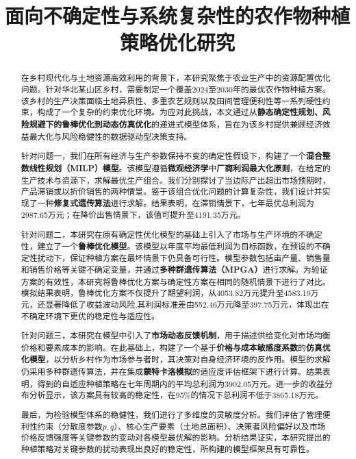 \documentclass[withoutpreface,bwprint]{cumcmthesis} %
\title{面向不确定性与系统复杂性的农作物种植策略优化研究}
\begin{document}
\maketitle
\begin{abstract}
在乡村现代化与土地资源高效利用的背景下，本研究聚焦于农业生产中的资源配置优化问题。针对华北某山区乡村，需要制定一个覆盖2024至2030年的最优农作物种植方案。该乡村的生产决策面临土地异质性、多重农艺规则以及田间管理便利性等一系列硬性约束，构成了一个复杂的约束优化环境。为应对此挑战，本文通过从\textbf{静态确定性规划、风险规避下的鲁棒优化到动态仿真优化}的递进式模型体系，旨在为该乡村提供兼顾经济效益最大化与风险稳健性的数据驱动型决策支持。

针对问题一，我们在所有经济与生产参数保持不变的确定性假设下，构建了一个\textbf{混合整数线性规划（MILP）模型}。该模型遵循\textbf{微观经济学}中\textbf{厂商利润最大化原则}，在给定的生产技术与资源下，求解最优生产组合。我们分别探讨了当边际产出超出市场预期时，产品滞销或以折价销售的两种情景。鉴于该组合优化问题的计算复杂性，我们设计并实现了一种\textbf{修复式遗传算法}进行求解。结果表明，在滞销情景下，七年最优总利润为2987.65万元；在降价出售情景下，该值可提升至4191.35万元。

针对问题二，本研究在原有确定性优化模型的基础上引入了市场与生产环境的不确定性，建立了一个\textbf{鲁棒优化模型}。该模型以年度平均最低利润为目标函数，在预设的不确定性扰动下，保证种植方案在最坏情景下仍具备可行性。模型参数包括亩产量、销售量和销售价格等关键不确定变量，并通过\textbf{多种群遗传算法（MPGA）}进行求解。为验证方案的有效性，本研究将鲁棒优化方案与确定性方案在相同的随机情景下进行了对比。模拟结果表明，鲁棒优化方案不仅提升了期望利润，从4053.82万元提升至4583.19万元，还显著降低了收益波动风险,其利润标准差由552.46万元降至397.75万元，体现出在不确定环境下更优的稳定性与适应性。


针对问题三，本研究在模型中引入了\textbf{市场动态反馈机制}，用于描述供给变化对市场均衡价格和要素成本的影响。在此基础上，构建了一个基于\textbf{价格与成本敏感度系数}的\textbf{仿真优化模型}，以分析乡村作为市场参与者时，其决策对自身经济环境的反作用。模型的求解仍采用多种群遗传算法，并在集成\textbf{蒙特卡洛模拟}的适应度评估框架下进行计算。结果表明，得到的自适应种植策略在七年周期内的平均总利润为3902.05万元。进一步的收益分布分析显示，该方案具有较高的稳定性，在95\%的情况下总利润不低于3865.18万元。

最后，为检验模型体系的稳健性，我们进行了多维度的灵敏度分析。我们评估了管理便利性约束（分散度参数$p, q$）、核心生产要素（土地总面积）、决策者风险偏好以及市场价格反馈强度等关键参数的变动对各模型最优解的影响。分析结果证实，本研究提出的种植策略对关键参数的扰动表现出良好的稳定性，所构建的模型框架具有可靠性。








\end{abstract}
\end{document}

